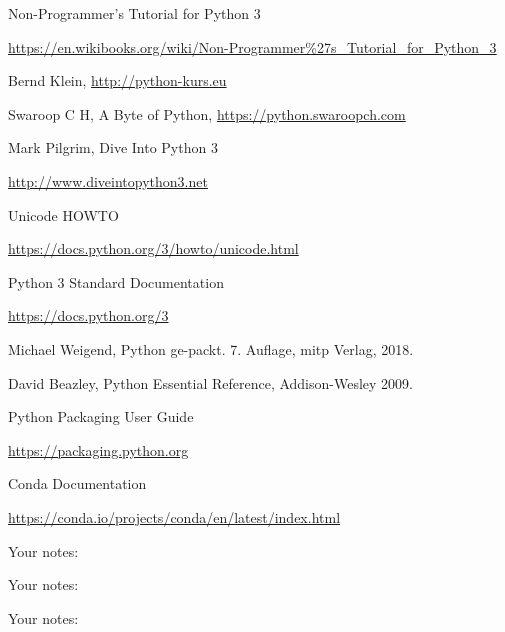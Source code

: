 \documentclass[9pt,a4wide]{extarticle}
\begin{document}
\begin{thebibliography}{zzzz}

 Non-Programmer's Tutorial for Python 3

   \url{https://en.wikibooks.org/wiki/Non-Programmer%27s_Tutorial_for_Python_3}

 Bernd Klein, \url{http://python-kurs.eu}

 Swaroop C H, A Byte of Python, \url{https://python.swaroopch.com}

 Mark Pilgrim, Dive Into Python 3

    \url{http://www.diveintopython3.net}

 Unicode HOWTO

    \url{https://docs.python.org/3/howto/unicode.html}

 Python 3 Standard Documentation

    \url{https://docs.python.org/3}

 Michael Weigend, Python ge-packt. 7. Auflage, mitp Verlag, 2018.

 David Beazley, Python Essential Reference, Addison-Wesley 2009.

 Python Packaging User Guide

    \url{https://packaging.python.org}

 Conda Documentation

    \url{https://conda.io/projects/conda/en/latest/index.html}

\end{thebibliography}


\newpage

Your notes:

\newpage

Your notes:

\newpage

Your notes:


\end{document}
